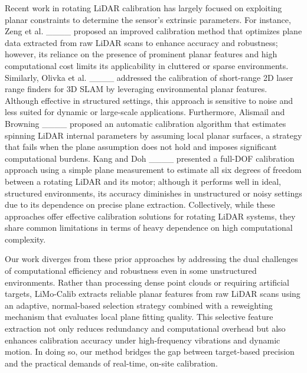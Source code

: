 Recent work in rotating LiDAR calibration has largely focused on exploiting planar constraints to determine the sensor’s extrinsic parameters. For instance, Zeng et al. ____ proposed an improved calibration method that optimizes plane data extracted from raw LiDAR scans to enhance accuracy and robustness; however, its reliance on the presence of prominent planar features and high computational cost limits its applicability in cluttered or sparse environments. Similarly, Olivka et al. ____ addressed the calibration of short-range 2D laser range finders for 3D SLAM by leveraging environmental planar features. Although effective in structured settings, this approach is sensitive to noise and less suited for dynamic or large-scale applications. Furthermore, Alismail and Browning ____ proposed an automatic calibration algorithm that estimates spinning LiDAR internal parameters by assuming local planar surfaces, a strategy that fails when the plane assumption does not hold and imposes significant computational burdens. Kang and Doh ____ presented a full-DOF calibration approach using a simple plane measurement to estimate all six degrees of freedom between a rotating LiDAR and its motor; although it performs well in ideal, structured environments, its accuracy diminishes in unstructured or noisy settings due to its dependence on precise plane extraction. Collectively, while these approaches offer effective calibration solutions for rotating LiDAR systems, they share common limitations in terms of heavy dependence on high computational complexity.

Our work diverges from these prior approaches by addressing the dual challenges of computational efficiency and robustness even in some unstructured environments. Rather than processing dense point clouds or requiring artificial targets, LiMo-Calib extracts reliable planar features from raw LiDAR scans using an adaptive, normal-based selection strategy combined with a reweighting mechanism that evaluates local plane fitting quality. This selective feature extraction not only reduces redundancy and computational overhead but also enhances calibration accuracy under high-frequency vibrations and dynamic motion. In doing so, our method bridges the gap between target-based precision and the practical demands of real-time, on-site calibration.